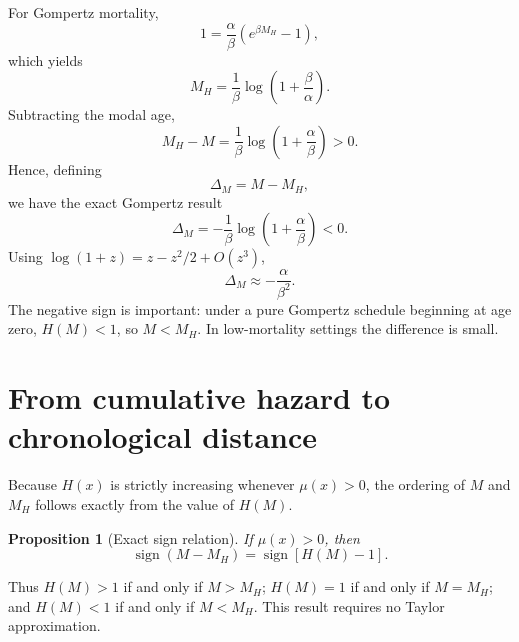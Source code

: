 \documentclass[doublespace]{interact}
\newtheorem{proposition}{Proposition}
\begin{document}
For Gompertz mortality,
\begin{equation}
1=\frac{\alpha}{\beta}(e^{\beta M_H}-1),
\end{equation}
which yields
\begin{equation}
M_H=\frac{1}{\beta}\log\left(1+\frac{\beta}{\alpha}\right).
\end{equation}
Subtracting the modal age,
\begin{equation}
M_H-M=\frac{1}{\beta}\log\left(1+\frac{\alpha}{\beta}\right)>0.
\end{equation}
Hence, defining
\begin{equation}
\Delta_M=M-M_H,
\end{equation}
we have the exact Gompertz result
\begin{equation}
\boxed{\Delta_M=-\frac{1}{\beta}\log\left(1+\frac{\alpha}{\beta}\right)<0.}
\end{equation}
Using $\log(1+z)=z-z^2/2+O(z^3)$,
\begin{equation}
\boxed{\Delta_M\approx-\frac{\alpha}{\beta^2}.}
\end{equation}
The negative sign is important: under a pure Gompertz schedule beginning at age zero, $H(M)<1$, so $M<M_H$. In low-mortality settings the difference is small.

\section{From cumulative hazard to chronological distance}

Because $H(x)$ is strictly increasing whenever $\mu(x)>0$, the ordering of $M$ and $M_H$ follows exactly from the value of $H(M)$.

\begin{proposition}[Exact sign relation]
If $\mu(x)>0$, then
\begin{equation}
\boxed{\operatorname{sign}(M-M_H)=\operatorname{sign}[H(M)-1].}
\end{equation}
\end{proposition}

Thus $H(M)>1$ if and only if $M>M_H$; $H(M)=1$ if and only if $M=M_H$; and $H(M)<1$ if and only if $M<M_H$. This result requires no Taylor approximation.
\end{document}
